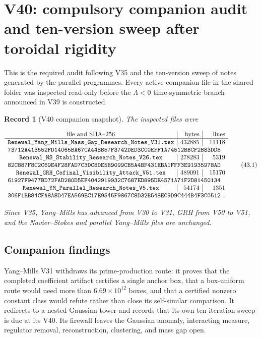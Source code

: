 \documentclass[11pt]{article}
\newtheorem{record}[theorem]{Record}
\theoremstyle{remark}
\begin{document}
\section{V40: compulsory companion audit and ten-version sweep after toroidal rigidity}
\label{sec:v19v40}

This is the required audit following V35 and the ten-version sweep of
notes generated by the parallel programmes.  Every active companion
file in the shared folder was inspected read-only before the
\(\Lambda<0\) time-symmetric branch announced in V39 is constructed.

\begin{record}[V40 companion snapshot]
\label{rec:v19v40-snapshot}
The inspected files were

\[
\begin{array}{c|r|r}
\hbox{file and SHA--256}&\hbox{bytes}&\hbox{lines}\\ \hline
\texttt{Renewal\_Yang\_Mills\_Mass\_Gap\_Research\_Notes\_V31.tex}
&432885&11118\\
\multicolumn{3}{l}{
\texttt{73712A413552FD14065BA67CA448B57F3742DED3CC0EFF1A74512BBCF2B83DDB}}
\\
\texttt{Renewal\_NS\_Stability\_Research\_Notes\_V26.tex}
&278283&5319\\
\multicolumn{3}{l}{
\texttt{82C887F8C2C69E4F28FAD7C3DC8DE5B9099CB5A4BF431EBA1FFF3E91935978AD}}
\\
\texttt{Renewal\_GRH\_Cofinal\_Visibility\_Attack\_V51.tex}
&489091&15170\\
\multicolumn{3}{l}{
\texttt{61927F9477BD72FAD280D5EF4042919932C7687ED895DE4571A71F2D81450134}}
\\
\texttt{Renewal\_YM\_Parallel\_Research\_Notes\_V5.tex}
&54174&1351\\
\multicolumn{3}{l}{
\texttt{306F1BB84CFA8A8D47EA569EC17E9545F9867C8D32B548EC9D9C444B4F3C0512}}.
\end{array}                                                     \tag{43.1}
\]

Since V35, Yang--Mills has advanced from V30 to V31, GRH from V50 to
V51, and the Navier--Stokes and parallel Yang--Mills files are
unchanged.
\end{record}

\subsection{Companion findings}

Yang--Mills V31 withdraws its prime-production route: it proves that
the completed coefficient artifact certifies a single anchor box, that a
box-uniform route would need more than \(6.69\times10^{12}\) boxes, and
that a certified nonzero constant class would refute rather than close
its self-similar comparison.  It redirects to a nested Gaussian tower
and records that its own ten-iteration sweep is due at its V40.  Its
firewall leaves the Gaussian anomaly, interacting measure, regulator
removal, reconstruction, clustering, and mass gap open.
\end{document}
